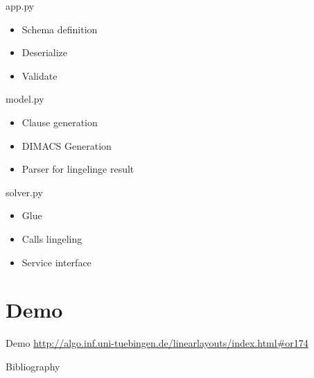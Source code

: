 \documentclass[11pt]{beamer}
\begin{document}
    \begin{frame}{app.py}
        \begin{itemize}
            \item Schema definition
            \item Deserialize
            \item Validate
        \end{itemize}
    \end{frame}

    \begin{frame}{model.py}
        \begin{itemize}
            \item Clause generation
            \item DIMACS Generation
            \item Parser for lingelinge result
        \end{itemize}
    \end{frame}

    \begin{frame}{solver.py}
        \begin{itemize}
            \item Glue
            \item Calls lingeling
            \item Service interface
        \end{itemize}
    \end{frame}

    \section{Demo}\label{sec:demo}
    \begin{frame}{Demo}
        \url{http://algo.inf.uni-tuebingen.de/linearlayouts/index.html\#or174}
    \end{frame}

    \begin{frame}{Bibliography}
        
        
    \end{frame}
\end{document}
